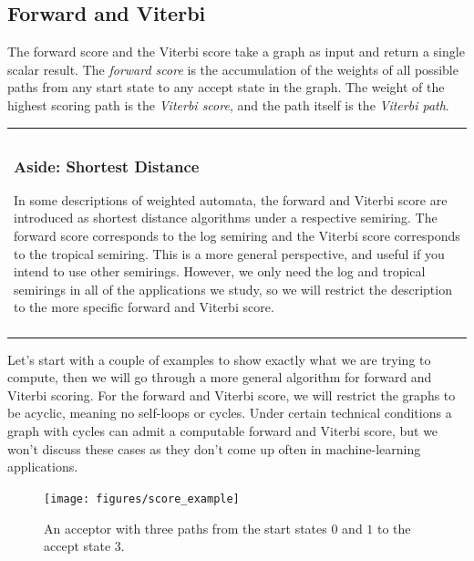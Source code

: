 \subsection{Forward and Viterbi}

The forward score and the Viterbi score take a graph as input and return a
single scalar result. The \emph{forward score} is the accumulation of the
weights of all possible paths from any start state to any accept state in the
graph. The weight of the highest scoring path is the \emph{Viterbi score}, and the
path itself is the \emph{Viterbi path}.

\begin{center}
\begin{tabular}{p{}}
\midrule\\
\vspace{-10mm}
\subsubsection{Aside: Shortest Distance}
In some descriptions of weighted automata, the forward and Viterbi score are
introduced as shortest distance algorithms under a respective semiring. The
forward score corresponds to the log semiring and the Viterbi score corresponds
to the tropical semiring. This is a more general perspective, and useful if you
intend to use other semirings. However, we only need the log and tropical
semirings in all of the applications we study, so we will restrict the
description to the more specific forward and Viterbi score.
\\\midrule\\
\end{tabular}
\end{center}

Let's start with a couple of examples to show exactly what we are trying to
compute, then we will go through a more general algorithm for forward and
Viterbi scoring. For the forward and Viterbi score, we will restrict the graphs
to be acyclic, meaning no self-loops or cycles. Under certain technical
conditions a graph with cycles can admit a computable forward and Viterbi
score, but we won't discuss these cases as they don't come up often in
machine-learning applications.

\begin{figure}
    \centering
    \texttt{[image: figures/score\_example]}
    \caption{An acceptor with three paths from the start states $0$ and $1$ to
    the accept state $3$.}
    \label{fig:score_example}
\end{figure}

